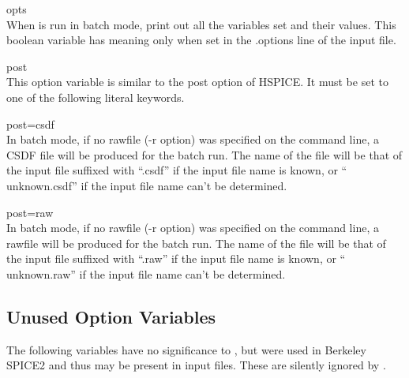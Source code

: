 \begin{description}
\item{\et opts}\\
When {\WRspice} is run in batch mode, print out all the variables set and
their values.  This boolean variable has meaning only when set in the
{\vt .options} line of the input file.

\item{\et post}\\
This option variable is similar to the {\vt post} option of HSPICE. 
It must be set to one of the following literal keywords.

\begin{description}
\item{\vt post=csdf}\\
In batch mode, if no rawfile ({\vt -r} option) was specified on the
{\WRspice} command line, a CSDF file will be produced for the batch
run.  The name of the file will be that of the input file suffixed
with ``{\vt .csdf}'' if the input file name is known, or ``{\vt
unknown.csdf}'' if the input file name can't be determined.

\item{\vt post=raw}\\
In batch mode, if no rawfile ({\vt -r} option) was specified on the
{\WRspice} command line, a rawfile will be produced for the batch run. 
The name of the file will be that of the input file suffixed with
``{\vt .raw}'' if the input file name is known, or ``{\vt
unknown.raw}'' if the input file name can't be determined.
\end{description}
\end{description}

\subsection{Unused Option Variables}

The following variables have no significance to {\WRspice}, but were
used in Berkeley SPICE2 and thus may be present in input files.  These
are silently ignored by {\WRspice}.

